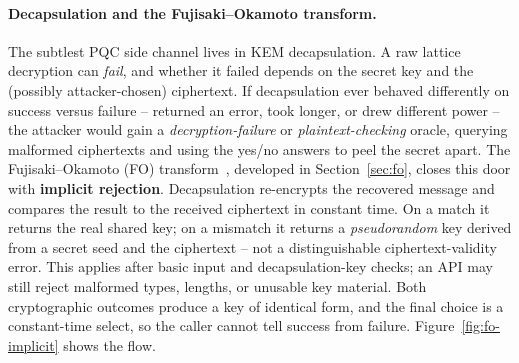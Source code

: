 \paragraph{Decapsulation and the Fujisaki--Okamoto transform.}
The subtlest PQC side channel lives in KEM decapsulation. A raw lattice decryption can
\emph{fail}, and whether it failed depends on the secret key and the (possibly
attacker-chosen) ciphertext. If decapsulation ever behaved differently on success
versus failure -- returned an error, took longer, or drew different power -- the
attacker would gain a \emph{decryption-failure} or \emph{plaintext-checking} oracle,
querying malformed ciphertexts and using the yes/no answers to peel the secret apart.
The Fujisaki--Okamoto (FO) transform~\cite{fo1999}, developed in
Section~\ref{sec:fo}, closes this door with \textbf{implicit
rejection}. Decapsulation re-encrypts the recovered message and compares the result to
the received ciphertext in constant time. On a match it returns the real shared key;
on a mismatch it returns a \emph{pseudorandom} key derived from a secret seed and the
ciphertext -- not a distinguishable ciphertext-validity error. This applies after
basic input and decapsulation-key checks; an API may still reject malformed types,
lengths, or unusable key material. Both cryptographic outcomes produce a key of identical form, and the
final choice is a constant-time select, so the caller cannot tell success from
failure. Figure~\ref{fig:fo-implicit} shows the flow.


